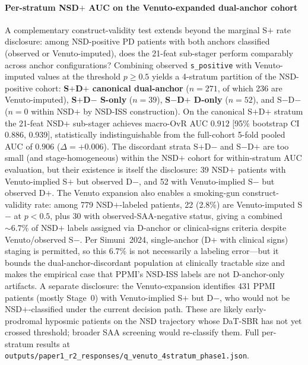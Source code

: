 \paragraph*{Per-stratum NSD$+$ AUC on the Venuto-expanded dual-anchor cohort} A complementary construct-validity test extends beyond the marginal S$+$ rate disclosure: among NSD-positive PD patients with both anchors classified (observed or Venuto-imputed), does the 21-feat sub-stager perform comparably across anchor configurations? Combining observed \texttt{s\_positive} with Venuto-imputed values at the threshold $p{\geq}0.5$ yields a 4-stratum partition of the NSD-positive cohort: \textbf{S$+$D$+$ canonical dual-anchor} ($n{=}271$, of which 236 are Venuto-imputed), \textbf{S$+$D$-$ S-only} ($n{=}39$), \textbf{S$-$D$+$ D-only} ($n{=}52$), and S$-$D$-$ ($n{=}0$ within NSD$+$ by NSD-ISS construction). On the canonical S$+$D$+$ stratum the 21-feat NSD$+$ sub-stager achieves macro-OvR AUC $\mathbf{0.912}$ [95\% bootstrap CI 0.886, 0.939], statistically indistinguishable from the full-cohort 5-fold pooled AUC of $0.906$ ($\Delta{=}{+}0.006$). The discordant strata S$+$D$-$ and S$-$D$+$ are too small (and stage-homogeneous) within the NSD$+$ cohort for within-stratum AUC evaluation, but their existence is itself the disclosure: 39 NSD$+$ patients with Venuto-implied S$+$ but observed D$-$, and 52 with Venuto-implied S$-$ but observed D$+$. The Venuto expansion also enables a smoking-gun construct-validity rate: among 779 NSD$+$-labeled patients, 22 (2.8\%) are Venuto-imputed S$-$ at $p{<}0.5$, plus 30 with observed-SAA-negative status, giving a combined ${\sim}6.7\%$ of NSD$+$ labels assigned via D-anchor or clinical-signs criteria despite Venuto/observed S$-$. Per Simuni~2024, single-anchor (D$+$ with clinical signs) staging is permitted, so this 6.7\% is not necessarily a labeling error---but it bounds the dual-anchor-discordant population at clinically tractable size and makes the empirical case that PPMI's NSD-ISS labels are not D-anchor-only artifacts. A separate disclosure: the Venuto-expansion identifies 431 PPMI patients (mostly Stage~0) with Venuto-implied S$+$ but D$-$, who would not be NSD$+$-classified under the current decision path. These are likely early-prodromal hyposmic patients on the NSD trajectory whose DaT-SBR has not yet crossed threshold; broader SAA screening would re-classify them. Full per-stratum results at \texttt{outputs/paper1\_r2\_responses/q\_venuto\_4stratum\_phase1.json}.

